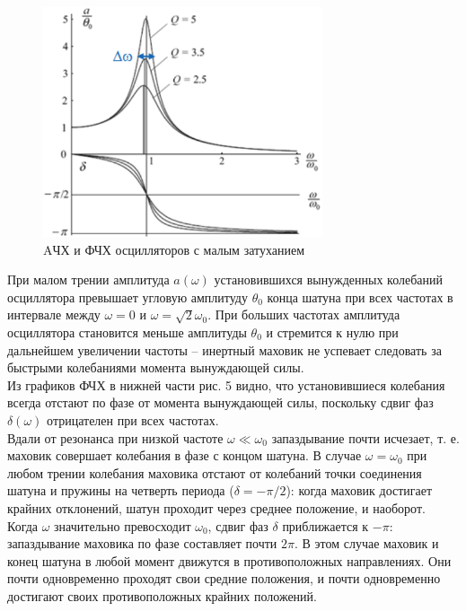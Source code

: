 \documentclass[a4paper]{article}
\begin{document}
\begin{figure}[H]
\begin{center}
\includegraphics[scale=0.3]{pick_5.png}
\caption{AЧХ и ФЧХ осцилляторов с малым затуханием}
\end{center}
\end{figure}
При малом трении амплитуда $a(\omega)$ установившихся вынужденных колебаний осциллятора превышает угловую амплитуду $\theta_0$
конца шатуна при всех частотах в интервале между $\omega=0$ и
$\omega=\sqrt{2}\omega_0$. При больших частотах амплитуда осциллятора становится меньше амплитуды $\theta_0$ и стремится к нулю при дальнейшем
увеличении частоты – инертный маховик не успевает следовать
за быстрыми колебаниями момента вынуждающей силы.\\
Из графиков ФЧХ в нижней части рис. 5 видно, что установившиеся колебания всегда отстают по фазе от момента вынуждающей силы, поскольку сдвиг фаз $\delta(\omega)$ отрицателен при всех частотах.\\
Вдали от резонанса при низкой частоте $\omega \ll \omega_0$ запаздывание почти исчезает, т. е. маховик совершает колебания в фазе с
концом шатуна. В случае $\omega = \omega_0$ при любом трении колебания
маховика отстают от колебаний точки соединения шатуна и пружины на четверть периода ($\delta = -\pi/2$): когда маховик достигает
крайних отклонений, шатун проходит через среднее положение, и
наоборот. Когда $\omega$ значительно превосходит $\omega_0$, сдвиг фаз $\delta$ приближается к $-\pi$: запаздывание маховика по фазе составляет почти $2\pi$. В этом случае маховик и конец шатуна в любой момент
движутся в противоположных направлениях. Они почти одновременно проходят свои средние положения, и почти одновременно достигают своих противоположных крайних положений.
\end{document}
